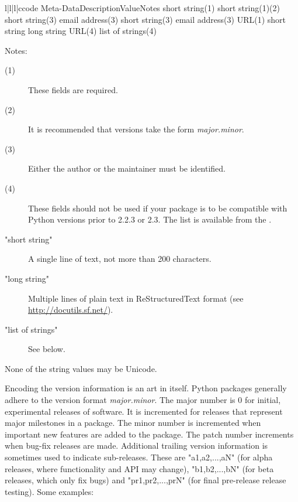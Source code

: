 \documentclass{howto}
\begin{document}
\begin{tableiv}{l|l|l|c}{code}%
  {Meta-Data}{Description}{Value}{Notes}
         {short string}{(1)}
         {short string}{(1)(2)}
         {short string}{(3)}
         {email address}{(3)}
         {short string}{(3)}
         {email address}{(3)}
         {URL}{(1)}
         {short string}{}
         {long string}{}
         {URL}{(4)}
         {list of strings}{(4)}
\end{tableiv}

\noindent Notes:
\begin{description}
\item[(1)] These fields are required.
\item[(2)] It is recommended that versions take the form
  \emph{major.minor}.
\item[(3)] Either the author or the maintainer must be identified.
\item[(4)] These fields should not be used if your package is to be
  compatible with Python versions prior to 2.2.3 or 2.3.  The list is
  available from the .

\item["short string"] A single line of text, not more than 200 characters.
\item["long string"] Multiple lines of plain text in ReStructuredText
  format (see \url{http://docutils.sf.net/}).
\item["list of strings"] See below.
\end{description}

None of the string values may be Unicode.

Encoding the version information is an art in itself. Python packages
generally adhere to the version format
\emph{major.minor}. The major number is
0 for
initial, experimental releases of software. It is incremented for
releases that represent major milestones in a package. The minor
number is incremented when important new features are added to the
package. The patch number increments when bug-fix releases are
made. Additional trailing version information is sometimes used to
indicate sub-releases.  These are "a1,a2,...,aN" (for alpha releases,
where functionality and API may change), "b1,b2,...,bN" (for beta
releases, which only fix bugs) and "pr1,pr2,...,prN" (for final
pre-release release testing). Some examples:
\end{document}
